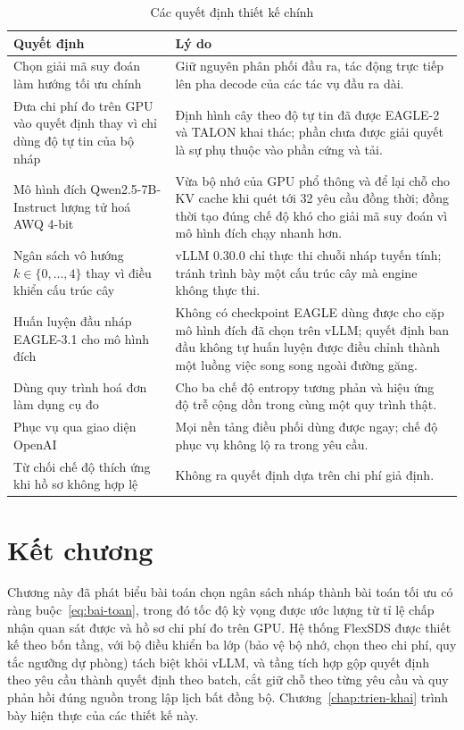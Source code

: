 \begin{table}[htbp]
\centering
\caption{Các quyết định thiết kế chính}
\label{tab:quyet-dinh}
\small
\begin{tabularx}{\linewidth}{@{}>{\raggedright\arraybackslash}p{40mm}>{\raggedright\arraybackslash}X@{}}
\toprule
\textbf{Quyết định} & \textbf{Lý do} \\
\midrule
Chọn giải mã suy đoán làm hướng tối ưu chính & Giữ nguyên phân phối đầu ra, tác động trực tiếp lên pha decode của các tác vụ đầu ra dài. \\
Đưa chi phí đo trên GPU vào quyết định thay vì chỉ dùng độ tự tin của bộ nháp & Định hình cây theo độ tự tin đã được EAGLE-2 và TALON khai thác; phần chưa được giải quyết là sự phụ thuộc vào phần cứng và tải. \\
Mô hình đích Qwen2.5-7B-Instruct lượng tử hoá AWQ 4-bit & Vừa bộ nhớ của GPU phổ thông và để lại chỗ cho KV cache khi quét tới 32 yêu cầu đồng thời; đồng thời tạo đúng chế độ khó cho giải mã suy đoán vì mô hình đích chạy nhanh hơn. \\
Ngân sách vô hướng $k\in\{0,\dots,4\}$ thay vì điều khiển cấu trúc cây & vLLM 0.30.0 chỉ thực thi chuỗi nháp tuyến tính; tránh trình bày một cấu trúc cây mà engine không thực thi. \\
Huấn luyện đầu nháp EAGLE-3.1 cho mô hình đích & Không có checkpoint EAGLE dùng được cho cặp mô hình đích đã chọn trên vLLM; quyết định ban đầu không tự huấn luyện được điều chỉnh thành một luồng việc song song ngoài đường găng. \\
Dùng quy trình hoá đơn làm dụng cụ đo & Cho ba chế độ entropy tương phản và hiệu ứng độ trễ cộng dồn trong cùng một quy trình thật. \\
Phục vụ qua giao diện OpenAI & Mọi nền tảng điều phối dùng được ngay; chế độ phục vụ không lộ ra trong yêu cầu. \\
Từ chối chế độ thích ứng khi hồ sơ không hợp lệ & Không ra quyết định dựa trên chi phí giả định. \\
\bottomrule
\end{tabularx}
\end{table}

\section{Kết chương}

Chương này đã phát biểu bài toán chọn ngân sách nháp thành bài toán tối ưu có ràng buộc~\eqref{eq:bai-toan}, trong đó tốc độ kỳ vọng được ước lượng từ tỉ lệ chấp nhận quan sát được và hồ sơ chi phí đo trên GPU. Hệ thống FlexSDS được thiết kế theo bốn tầng, với bộ điều khiển ba lớp (bảo vệ bộ nhớ, chọn theo chi phí, quy tắc ngưỡng dự phòng) tách biệt khỏi vLLM, và tầng tích hợp gộp quyết định theo yêu cầu thành quyết định theo batch, cắt giữ chỗ theo từng yêu cầu và quy phản hồi đúng nguồn trong lập lịch bất đồng bộ. Chương~\ref{chap:trien-khai} trình bày hiện thực của các thiết kế này.
